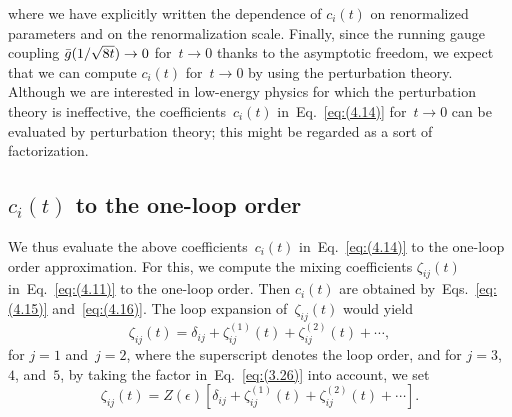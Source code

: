 where we have explicitly written the dependence of $c_i(t)$ on renormalized
parameters and on the renormalization scale. Finally, since the running gauge
coupling $\Bar{g}(1/\sqrt{8t})\to0$ for~$t\to0$ thanks to the asymptotic
freedom, we expect that we can compute $c_i(t)$ for~$t\to0$ by using the
perturbation theory. Although we are interested in low-energy physics for which
the perturbation theory is ineffective, the coefficients~$c_i(t)$
in~Eq.~\eqref{eq:(4.14)} for~$t\to0$ can be evaluated by perturbation theory;
this might be regarded as a sort of factorization.

\subsection{$c_i(t)$ to the one-loop order}
We thus evaluate the above coefficients~$c_i(t)$ in~Eq.~\eqref{eq:(4.14)} to
the one-loop order approximation. For this, we compute the mixing coefficients
$\zeta_{ij}(t)$ in~Eq.~\eqref{eq:(4.11)} to the one-loop order. Then $c_i(t)$
are obtained by~Eqs.~\eqref{eq:(4.15)} and~\eqref{eq:(4.16)}. The loop
expansion of~$\zeta_{ij}(t)$ would yield
\begin{equation}
   \zeta_{ij}(t)=\delta_{ij}+\zeta_{ij}^{(1)}(t)+\zeta_{ij}^{(2)}(t)+\dotsb,
\label{eq:(4.24)}
\end{equation}
for $j=1$ and~$j=2$, where the superscript denotes the loop order, and for
$j=3$, $4$, and~$5$, by taking the factor in~Eq.~\eqref{eq:(3.26)} into
account, we set 
\begin{equation}
   \zeta_{ij}(t)=Z(\epsilon)
   \left[\delta_{ij}+\zeta_{ij}^{(1)}(t)+\zeta_{ij}^{(2)}(t)+\dotsb\right].
\label{eq:(4.25)}
\end{equation}

